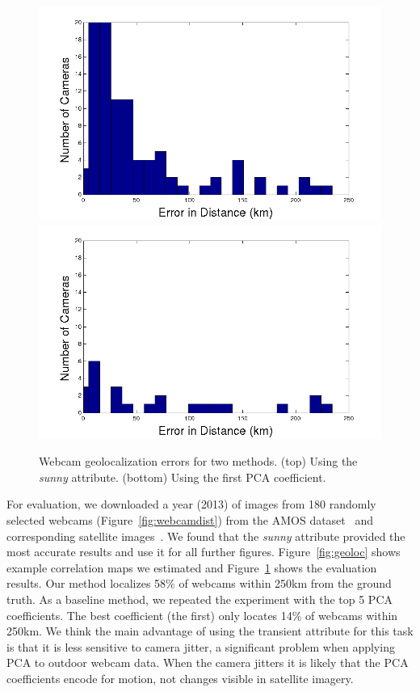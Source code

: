 \documentclass[10pt,twocolumn,letterpaper]{article}
\newcommand{\figref}[1]{Figure~\ref{fig:#1}}
\begin{document}
\begin{figure}[t]
  \centering
  \includegraphics[width=.98\linewidth, trim= 20mm 0mm 20mm 0mm]{figs/geoloc/tran_errors}
  \includegraphics[width=.98\linewidth, trim= 20mm 0mm 20mm 0mm]{figs/geoloc/pca_errors}
  \caption{Webcam geolocalization errors for two methods. (top)
    Using the \textit{sunny} attribute. (bottom)
    Using the first PCA coefficient.}
  \label{fig:locerror}
\end{figure}

For evaluation, we downloaded a year (2013) of images from 180 randomly
selected webcams (\figref{webcamdist}) from the AMOS
dataset~\cite{jacobs07amos} and corresponding satellite
images~\cite{satimssite}.  We found that the \textit{sunny} attribute provided
the most accurate results and use it for all further figures. \figref{geoloc}
shows example correlation maps we estimated and \figref{locerror} shows the
evaluation results. Our method localizes 58\% of webcams within 250km from the
ground truth. As a baseline method, we repeated the experiment with the top 5
PCA coefficients. The best coefficient (the first) only locates 14\% of webcams
within 250km. We think the main advantage of using the transient attribute for
this task is that it is less sensitive to camera jitter, a significant problem
when applying PCA to outdoor webcam data. When the camera jitters it is likely
that the PCA coefficients encode for motion, not changes visible in satellite
imagery.
\end{document}
